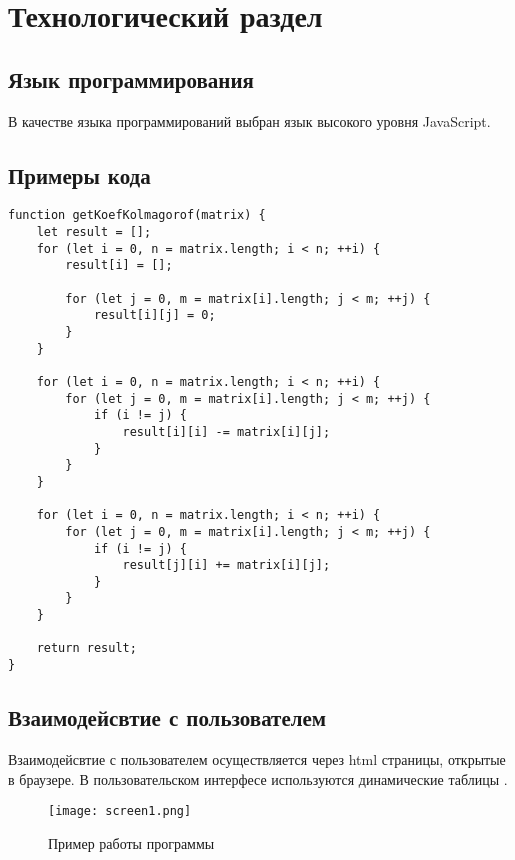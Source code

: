 \chapter{Технологический раздел}

\section{Язык программирования}
В качестве языка программирований выбран язык высокого уровня JavaScript.

\section{Примеры кода}

\begin{lstlisting}[caption={Получение коэфициентов уравнений Колмагорова}]
function getKoefKolmagorof(matrix) {
    let result = [];
    for (let i = 0, n = matrix.length; i < n; ++i) {
		result[i] = [];

        for (let j = 0, m = matrix[i].length; j < m; ++j) {
            result[i][j] = 0;
        }
    }

    for (let i = 0, n = matrix.length; i < n; ++i) {
        for (let j = 0, m = matrix[i].length; j < m; ++j) {
        	if (i != j) {
            	result[i][i] -= matrix[i][j];
        	}
        }
    }

    for (let i = 0, n = matrix.length; i < n; ++i) {
        for (let j = 0, m = matrix[i].length; j < m; ++j) {
        	if (i != j) {
            	result[j][i] += matrix[i][j];
        	}
        }
    }

    return result;
}
\end{lstlisting}

\section{Взаимодейсвтие с пользователем}

Взаимодейсвтие с пользователем осуществляется через html страницы, открытые в браузере. В пользовательском интерфесе используются динамические таблицы \cite{softtime-table}. 

\begin{figure}
  \centering
  \texttt{[image: screen1.png]}
  \caption{Пример работы программы}
\end{figure}
